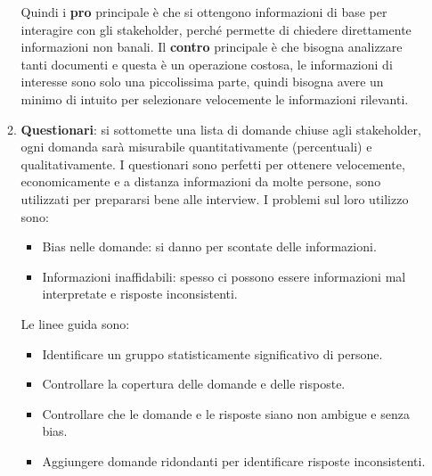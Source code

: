 \begin{itemize}
\begin{enumerate}
                        Quindi i \textbf{pro} principale è che si ottengono
                        informazioni di base per interagire con gli stakeholder,
                        perché permette di chiedere direttamente informazioni non
                        banali. Il \textbf{contro} principale è che bisogna
                        analizzare tanti documenti e questa è un operazione
                        costosa, le informazioni di interesse sono solo una
                        piccolissima parte, quindi bisogna avere un minimo di
                        intuito per selezionare velocemente le informazioni rilevanti.
                  \item \textbf{Questionari}: si sottomette una lista di domande
                        chiuse agli stakeholder, ogni domanda sarà misurabile
                        quantitativamente (percentuali) e qualitativamente. I
                        questionari sono perfetti per ottenere velocemente,
                        economicamente e a distanza informazioni da molte persone,
                        sono utilizzati per prepararsi bene alle interview. I
                        problemi sul loro utilizzo sono:
                        \begin{itemize}
                              \item Bias nelle domande: si danno per scontate
                                    delle informazioni.
                              \item Informazioni inaffidabili: spesso ci possono
                                    essere informazioni mal interpretate e risposte
                                    inconsistenti.
                        \end{itemize}
                        Le linee guida sono:
                        \begin{itemize}
                              \item Identificare un gruppo statisticamente
                                    significativo di persone.
                              \item Controllare la copertura delle domande e delle
                                    risposte.
                              \item Controllare che le domande e le risposte siano
                                    non ambigue e senza bias.
                              \item Aggiungere domande ridondanti per identificare
                                    risposte inconsistenti.

\end{itemize}
\end{enumerate}
\end{itemize}
